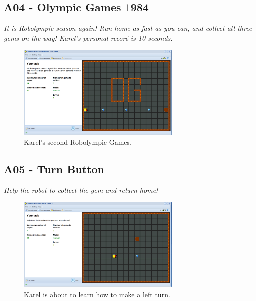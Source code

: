 \documentclass[article,A4,12pt]{llncs}
\begin{document}
\subsection{A04 - Olympic Games 1984}

{\em It is Robolympic season again! Run home as fast as you can, 
and collect all three gems on the way! Karel's personal record is 10 seconds.}

\begin{figure}[!ht]
\begin{center}
\includegraphics[width=0.7\textwidth]{img/a04.png}
\end{center}
\vspace{-4mm}
\caption{Karel's second Robolympic Games.}
\label{fig:a04}
\end{figure}
\noindent


\subsection{A05 - Turn Button}

{\em Help the robot to collect the gem and return home!}

\begin{figure}[!ht]
\begin{center}
\includegraphics[width=0.7\textwidth]{img/a05.png}
\end{center}
\vspace{-4mm}
\caption{Karel is about to learn how to make a left turn.}
\label{fig:a05}
\vspace{-1cm}
\end{figure}
\noindent
\newpage
\end{document}
